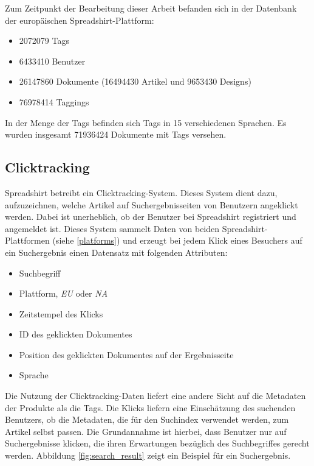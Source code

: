 Zum Zeitpunkt der Bearbeitung dieser Arbeit befanden sich in der Datenbank der europäischen Spreadshirt-Plattform:

\begin{itemize}
    \item \num{2072079} Tags
    \item \num{6433410} Benutzer
    \item \num{26147860} Dokumente (\num{16494430} Artikel und \num{9653430} Designs)
    \item \num{76978414} Taggings
\end{itemize}

In der Menge der Tags befinden sich Tags in \num{15} verschiedenen Sprachen. Es wurden insgesamt \num{71936424} Dokumente mit Tags versehen.

\subsection{Clicktracking}
Spreadshirt betreibt ein Clicktracking-System. Dieses System dient dazu, aufzuzeichnen, welche Artikel auf Suchergebnisseiten von Benutzern angeklickt werden. Dabei ist unerheblich, ob der Benutzer bei Spreadshirt registriert und angemeldet ist. Dieses System sammelt Daten von beiden Spreadshirt-Plattformen (siehe \ref{platforms}) und erzeugt bei jedem Klick eines Besuchers auf ein Suchergebnis einen Datensatz mit folgenden Attributen:

\begin{itemize}
    \item Suchbegriff
    \item Plattform, \emph{EU} oder \emph{NA}
    \item Zeitstempel des Klicks
    \item ID des geklickten Dokumentes
    \item Position des geklickten Dokumentes auf der Ergebnisseite
    \item Sprache
\end{itemize}

Die Nutzung der Clicktracking-Daten liefert eine andere Sicht auf die Metadaten der Produkte als die Tags. Die Klicks liefern eine Einschätzung des suchenden Benutzers, ob die Metadaten, die für den Suchindex verwendet werden, zum Artikel selbst passen. Die Grundannahme ist hierbei, dass Benutzer nur auf Suchergebnisse klicken, die ihren Erwartungen bezüglich des Suchbegriffes gerecht werden. Abbildung \ref{fig:search_result} zeigt ein Beispiel für ein Suchergebnis.

